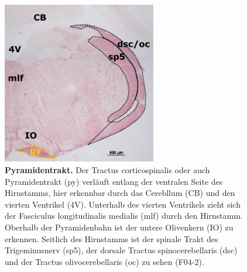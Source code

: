 \documentclass[12pt,a4paper,pdftex]{article}
\begin{document}
\begin{figure}[H]
    \centering
    \includegraphics[width=0.6\textwidth]{pictures/Bilder_Laura/py_F04_2P_025x.png}
    \caption[Pyramidentrakt]{\textbf{Pyramidentrakt.} Der Tractus corticospinalis oder auch Pyramidentrakt (py) verläuft entlang der ventralen Seite des Hirnstamms, hier erkennbar durch das Cerebllum (CB) und den vierten Ventrikel (4V). Unterhalb des vierten Ventrikels zieht sich der Fasciculus longitudinalis medialis (mlf) durch den Hirnstamm. Oberhalb der Pyramidenbahn ist der untere Olivenkern (IO) zu erkennen. Seitlich des Hirnstamms ist der spinale Trakt des Trigeminusnerv (sp5), der dorsale Tractus spinocerebellaris (dsc) und der Tractus olivocerebellaris (oc) zu sehen (F04-2).}
    \label{fig:pyramidentrakt}
\end{figure}
\end{document}
